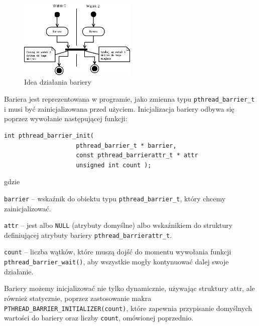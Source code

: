 \begin{figure}[!h]
\centering
\includegraphics[width=0.5\textwidth]{img/thrd_barrier}
\caption{Idea działania bariery}
\label{fig:thrd_barrier}
\end{figure}

Bariera jest reprezentowana w programie, jako zmienna typu \lstinline[style=MyCStyle]{pthread_barrier_t} i musi być zainicjalizowana przed użyciem. Inicjalizacja bariery odbywa się poprzez wywołanie następującej funkcji:

\begin{lstlisting}[style=MyCStyle]
int pthread_barrier_init(
                    pthread_barrier_t * barrier,
                    const pthread_barrierattr_t * attr
                    unsigned int count );

\end{lstlisting}

gdzie

\begin{myitemize}
\item \lstinline[style=MyCStyle]{barrier} -- wskaźnik do obiektu typu \lstinline[style=MyCStyle]{pthread_barrier_t}, który chcemy zainicjalizować.
\item \lstinline[style=MyCStyle]{attr} -- jest albo \lstinline[style=MyCStyle]{NULL} (atrybuty domyślne) albo wskaźnikiem do struktury definiującej atrybuty bariery \lstinline[style=MyCStyle]{pthread_barrierattr_t}.
\item \lstinline[style=MyCStyle]{count} -- liczba wątków, które muszą dojść do momentu wywołania funkcji \lstinline[style=MyCStyle]{pthread_barrier_wait()}, aby wszystkie mogły kontynuować dalej swoje działanie.
\end{myitemize}

Bariery możemy inicjalizować nie tylko dynamicznie, używając struktury attr, ale również  statycznie, poprzez zastosowanie makra \lstinline[style=MyCStyle]{PTHREAD_BARRIER_INITIALIZER(count)}, które zapewnia przypisanie domyślnych wartości do bariery oraz liczby \lstinline[style=MyCStyle]{count}, omówionej poprzednio.

